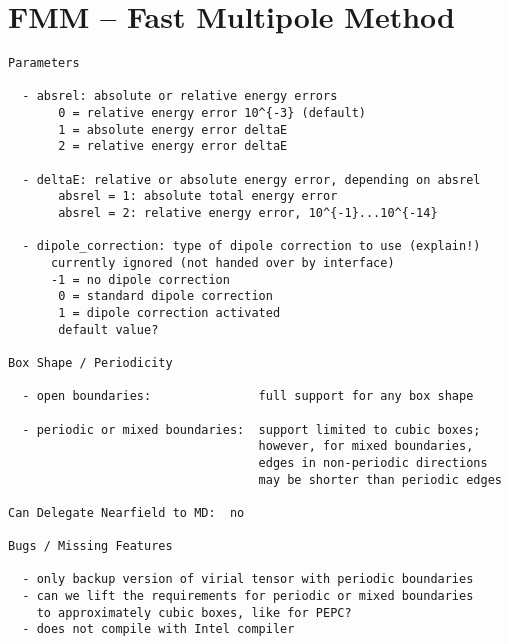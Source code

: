 \chapter{FMM -- Fast Multipole Method}
\label{cha:fmm}

\begin{verbatim}
Parameters

  - absrel: absolute or relative energy errors 
       0 = relative energy error 10^{-3} (default) 
       1 = absolute energy error deltaE 
       2 = relative energy error deltaE 

  - deltaE: relative or absolute energy error, depending on absrel
       absrel = 1: absolute total energy error 
       absrel = 2: relative energy error, 10^{-1}...10^{-14}

  - dipole_correction: type of dipole correction to use (explain!)
      currently ignored (not handed over by interface)
      -1 = no dipole correction
       0 = standard dipole correction
       1 = dipole correction activated
       default value?

Box Shape / Periodicity

  - open boundaries:               full support for any box shape

  - periodic or mixed boundaries:  support limited to cubic boxes;
                                   however, for mixed boundaries, 
                                   edges in non-periodic directions 
                                   may be shorter than periodic edges

Can Delegate Nearfield to MD:  no

Bugs / Missing Features

  - only backup version of virial tensor with periodic boundaries
  - can we lift the requirements for periodic or mixed boundaries
    to approximately cubic boxes, like for PEPC?
  - does not compile with Intel compiler
\end{verbatim}



